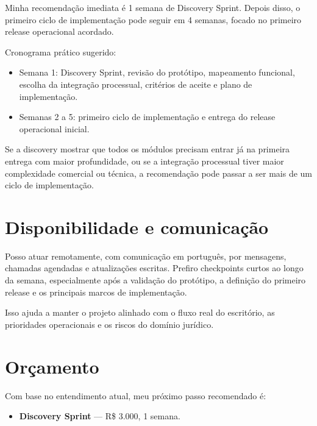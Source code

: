 \documentclass[11pt,a4paper]{article}
\begin{document}
Minha recomendação imediata é 1 semana de Discovery Sprint. Depois disso, o primeiro ciclo de implementação pode seguir em 4 semanas, focado no primeiro release operacional acordado.\par

Cronograma prático sugerido:\par

\begin{itemize}
\item Semana 1: Discovery Sprint, revisão do protótipo, mapeamento funcional, escolha da integração processual, critérios de aceite e plano de implementação.
\item Semanas 2 a 5: primeiro ciclo de implementação e entrega do release operacional inicial.
\end{itemize}

Se a discovery mostrar que todos os módulos precisam entrar já na primeira entrega com maior profundidade, ou se a integração processual tiver maior complexidade comercial ou técnica, a recomendação pode passar a ser mais de um ciclo de implementação.\par

\section*{Disponibilidade e comunicação}

Posso atuar remotamente, com comunicação em português, por mensagens, chamadas agendadas e atualizações escritas. Prefiro checkpoints curtos ao longo da semana, especialmente após a validação do protótipo, a definição do primeiro release e os principais marcos de implementação.\par

Isso ajuda a manter o projeto alinhado com o fluxo real do escritório, as prioridades operacionais e os riscos do domínio jurídico.\par

\section*{Orçamento}

Com base no entendimento atual, meu próximo passo recomendado é:\par

\begin{itemize}
\item \textbf{Discovery Sprint} --- R\$ 3.000, 1 semana.
\end{itemize}
\end{document}
